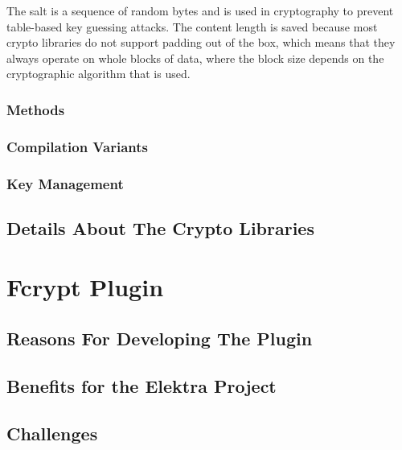 The salt is a sequence of random bytes and is used in cryptography to prevent
table-based key guessing attacks.
The content length is saved because most crypto libraries do not support
padding out of the box, which means that they always operate on whole blocks
of data, where the block size depends on the cryptographic algorithm that is
used.

\subsubsection{Methods}


\subsubsection{Compilation Variants}


\subsubsection{Key Management}



\subsection{Details About The Crypto Libraries}\label{details-about-the-crypto-libraries}



\section{Fcrypt Plugin}\label{fcrypt-plugin}

\subsection{Reasons For Developing The Plugin}


\subsection{Benefits for the Elektra Project}


\subsection{Challenges}


